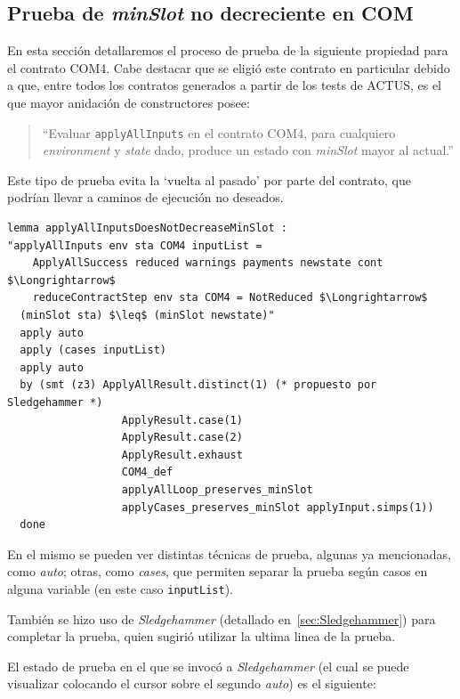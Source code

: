 \documentclass[12pt]{book}
\begin{document}
\subsection{Prueba de \textit{minSlot} no decreciente en COM}

En esta sección detallaremos el proceso de prueba de la siguiente propiedad para el contrato COM4. Cabe destacar que se eligió este contrato en particular debido a que, entre todos los contratos generados a partir de los tests de ACTUS, es el que mayor anidación de constructores posee:

\begin{quote} 
``Evaluar \texttt{applyAllInputs} en el contrato COM4, para cualquiero \textit{environment} y \textit{state} dado, produce un estado con \textit{minSlot} mayor al actual.''
\end{quote}

Este tipo de prueba evita la `vuelta al pasado' por parte del contrato, que podrían llevar a caminos de ejecución no deseados.

\begin{lstlisting}[style=Isabelle]
lemma applyAllInputsDoesNotDecreaseMinSlot :
"applyAllInputs env sta COM4 inputList = 
    ApplyAllSuccess reduced warnings payments newstate cont $\Longrightarrow$
    reduceContractStep env sta COM4 = NotReduced $\Longrightarrow$
  (minSlot sta) $\leq$ (minSlot newstate)"
  apply auto
  apply (cases inputList)
  apply auto 
  by (smt (z3) ApplyAllResult.distinct(1) (* propuesto por Sledgehammer *)
                  ApplyResult.case(1)
                  ApplyResult.case(2)
                  ApplyResult.exhaust
                  COM4_def
                  applyAllLoop_preserves_minSlot
                  applyCases_preserves_minSlot applyInput.simps(1))
  done
\end{lstlisting}

En el mismo se pueden ver distintas técnicas de prueba, algunas ya mencionadas, como \textit{auto}; otras, como \textit{cases}, que permiten separar la prueba según casos en alguna variable (en este caso \texttt{inputList}).

También se hizo uso de \textit{Sledgehammer} (detallado en~\ref{sec:Sledgehammer}) para completar la prueba, quien sugirió utilizar la ultima linea de la prueba.

El estado de prueba en el que se invocó a \textit{Sledgehammer} (el cual se puede visualizar colocando el cursor sobre el segundo \textit{auto}) es el siguiente:
\end{document}

